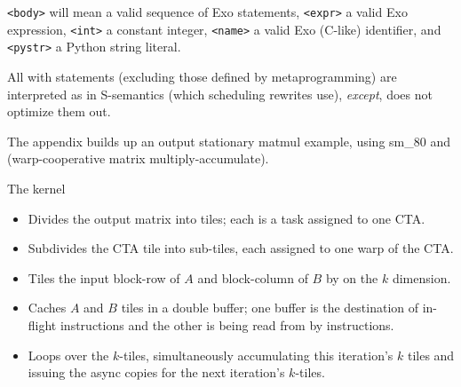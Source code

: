 \newpage
{}

\texttt{<body>} will mean a valid sequence of Exo statements, \texttt{<expr>} a valid Exo expression, \texttt{<int>} a constant integer, \texttt{<name>} a valid Exo (C-like) identifier, and \texttt{<pystr>} a Python string literal.


All with statements (excluding those defined by metaprogramming) are interpreted as  in S-semantics (which scheduling rewrites use), \textit{except},  does not optimize them out.
















The appendix builds up an output stationary matmul example, using sm\_80  and  (warp-cooperative matrix multiply-accumulate).

The kernel
\begin{itemize}
  \item Divides the output matrix into  tiles; each is a task assigned to one CTA.
  \item Subdivides the CTA tile into sub-tiles, each assigned to one warp of the CTA.
  \item Tiles the input block-row of $A$ and block-column of $B$ by  on the $k$ dimension.
  \item Caches $A$ and $B$ tiles in a double buffer; one buffer is the destination of in-flight  instructions and the other is being read from by  instructions.
  \item Loops over the $k$-tiles, simultaneously accumulating this iteration's $k$ tiles and issuing the async copies for the next iteration's $k$-tiles.
\end{itemize}

\newpage
{}

